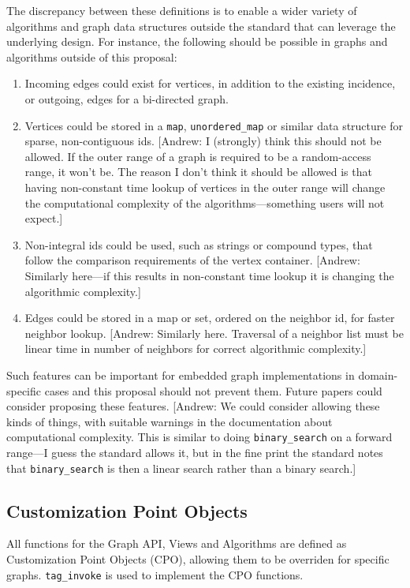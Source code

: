 \documentclass[10pt,onecolumn]{article}
\newcommand{\tcode}[1]{\lstinline[breaklines=true]{#1}}
\newcommand{\comment}[2]{{\color{comment}[{\sc #1:} \textsf{#2}]}}
\newcommand{\andrew}[1]{\comment{Andrew}{#1}}
\begin{document}
The discrepancy between these definitions is to enable a wider variety of algorithms and graph data structures outside the standard that 
can leverage the underlying design. For instance, the following should be possible in graphs and algorithms outside of this proposal:

\begin{enumerate}
\item Incoming edges could exist for vertices, in addition to the existing incidence, or outgoing, edges for a bi-directed graph.
\item Vertices could be stored in a \tcode{map}, \tcode{unordered_map} or similar data structure for sparse, non-contiguous ids.
\andrew{I (strongly) think this should not be allowed.  If the outer range of a graph is required to be a random-access range, it won't be.  The reason I don't think it should be allowed is that having non-constant time lookup of vertices in the outer range will change the computational complexity of the algorithms---something users will not expect.}
\item Non-integral ids could be used, such as strings or compound types, that follow the comparison requirements of the vertex container.  \andrew{Similarly here---if this results in non-constant time lookup it is changing the algorithmic complexity.}
\item Edges could be stored in a map or set, ordered on the neighbor id, for faster neighbor lookup.
  \andrew{Similarly here.  Traversal of a neighbor list must be linear time in number of neighbors for correct algorithmic complexity.}
\end{enumerate}

Such features can be important for embedded graph implementations in domain-specific cases and this proposal should not prevent them. 
Future papers could consider proposing these features.
\andrew{We could consider allowing these kinds of things, with suitable warnings in the documentation about computational complexity.  This is similar to doing \tcode{binary_search} on a forward range---I guess the standard allows it, but in the fine print the standard notes that \tcode{binary_search} is then a linear search rather than a binary search.}

\subsection{Customization Point Objects}
All functions for the Graph API, Views and Algorithms are defined as Customization Point Objects (CPO), allowing them to be overriden for
specific graphs. \tcode{tag_invoke} is used to implement the CPO functions.
\end{document}
